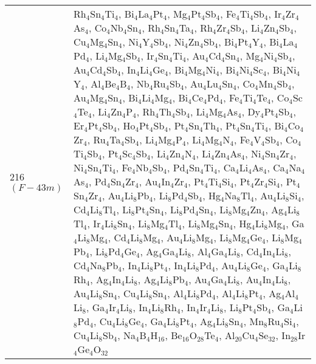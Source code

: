 {\begin{longtable}{p{7.315em}|p{40em}}
    216 $(F-43m)$ & Rh$_{4}$Sn$_{4}$Ti$_{4}$, Bi$_{4}$La$_{4}$Pt$_{4}$, Mg$_{4}$Pt$_{4}$Sb$_{4}$, Fe$_{4}$Ti$_{4}$Sb$_{4}$, Ir$_{4}$Zr$_{4}$As$_{4}$, Co$_{4}$Nb$_{4}$Sn$_{4}$, Rh$_{4}$Sn$_{4}$Ta$_{4}$, Rh$_{4}$Zr$_{4}$Sb$_{4}$, Li$_{4}$Zn$_{4}$Sb$_{4}$, Cu$_{4}$Mg$_{4}$Sn$_{4}$, Ni$_{4}$Y$_{4}$Sb$_{4}$, Ni$_{4}$Zn$_{4}$Sb$_{4}$, Bi$_{4}$Pt$_{4}$Y$_{4}$, Bi$_{4}$La$_{4}$Pd$_{4}$, Li$_{4}$Mg$_{4}$Sb$_{4}$, Ir$_{4}$Sn$_{4}$Ti$_{4}$, Au$_{4}$Cd$_{4}$Sn$_{4}$, Mg$_{4}$Ni$_{4}$Sb$_{4}$, Au$_{4}$Cd$_{4}$Sb$_{4}$, In$_{4}$Li$_{4}$Ge$_{4}$, Bi$_{4}$Mg$_{4}$Ni$_{4}$, Bi$_{4}$Ni$_{4}$Sc$_{4}$, Bi$_{4}$Ni$_{4}$Y$_{4}$, Al$_{4}$Be$_{4}$B$_{4}$, Nb$_{4}$Ru$_{4}$Sb$_{4}$, Au$_{4}$Lu$_{4}$Sn$_{4}$, Co$_{4}$Mn$_{4}$Sb$_{4}$, Au$_{4}$Mg$_{4}$Sn$_{4}$, Bi$_{4}$Li$_{4}$Mg$_{4}$, Bi$_{4}$Ce$_{4}$Pd$_{4}$, Fe$_{4}$Ti$_{4}$Te$_{4}$, Co$_{4}$Sc$_{4}$Te$_{4}$, Li$_{4}$Zn$_{4}$P$_{4}$, Rh$_{4}$Th$_{4}$Sb$_{4}$, Li$_{4}$Mg$_{4}$As$_{4}$, Dy$_{4}$Pt$_{4}$Sb$_{4}$, Er$_{4}$Pt$_{4}$Sb$_{4}$, Ho$_{4}$Pt$_{4}$Sb$_{4}$, Pt$_{4}$Sn$_{4}$Th$_{4}$, Pt$_{4}$Sn$_{4}$Ti$_{4}$, Bi$_{4}$Co$_{4}$Zr$_{4}$, Ru$_{4}$Ta$_{4}$Sb$_{4}$, Li$_{4}$Mg$_{4}$P$_{4}$, Li$_{4}$Mg$_{4}$N$_{4}$, Fe$_{4}$V$_{4}$Sb$_{4}$, Co$_{4}$Ti$_{4}$Sb$_{4}$, Pt$_{4}$Sc$_{4}$Sb$_{4}$, Li$_{4}$Zn$_{4}$N$_{4}$, Li$_{4}$Zn$_{4}$As$_{4}$, Ni$_{4}$Sn$_{4}$Zr$_{4}$, Ni$_{4}$Sn$_{4}$Ti$_{4}$, Fe$_{4}$Nb$_{4}$Sb$_{4}$, Pd$_{4}$Sn$_{4}$Ti$_{4}$, Ca$_{4}$Li$_{4}$As$_{4}$, Ca$_{4}$Na$_{4}$As$_{4}$, Pd$_{4}$Sn$_{4}$Zr$_{4}$, Au$_{4}$In$_{4}$Zr$_{4}$, Pt$_{4}$Ti$_{4}$Si$_{4}$, Pt$_{4}$Zr$_{4}$Si$_{4}$, Pt$_{4}$Sn$_{4}$Zr$_{4}$, Au$_{4}$Li$_{8}$Pb$_{4}$, Li$_{8}$Pd$_{4}$Sb$_{4}$, Hg$_{4}$Na$_{8}$Tl$_{4}$, Au$_{4}$Li$_{8}$Si$_{4}$, Cd$_{4}$Li$_{8}$Tl$_{4}$, Li$_{8}$Pt$_{4}$Sn$_{4}$, Li$_{8}$Pd$_{4}$Sn$_{4}$, Li$_{8}$Mg$_{4}$Zn$_{4}$, Ag$_{4}$Li$_{8}$Tl$_{4}$, Ir$_{4}$Li$_{8}$Sn$_{4}$, Li$_{8}$Mg$_{4}$Tl$_{4}$, Li$_{8}$Mg$_{4}$Sn$_{4}$, Hg$_{4}$Li$_{8}$Mg$_{4}$, Ga$_{4}$Li$_{8}$Mg$_{4}$, Cd$_{4}$Li$_{8}$Mg$_{4}$, Au$_{4}$Li$_{8}$Mg$_{4}$, Li$_{8}$Mg$_{4}$Ge$_{4}$, Li$_{8}$Mg$_{4}$Pb$_{4}$, Li$_{8}$Pd$_{4}$Ge$_{4}$, Ag$_{4}$Ga$_{4}$Li$_{8}$, Al$_{4}$Ga$_{4}$Li$_{8}$, Cd$_{4}$In$_{4}$Li$_{8}$, Cd$_{4}$Na$_{8}$Pb$_{4}$, In$_{4}$Li$_{8}$Pt$_{4}$, In$_{4}$Li$_{8}$Pd$_{4}$, Au$_{4}$Li$_{8}$Ge$_{4}$, Ga$_{4}$Li$_{8}$Rh$_{4}$, Ag$_{4}$In$_{4}$Li$_{8}$, Ag$_{4}$Li$_{8}$Pb$_{4}$, Au$_{4}$Ga$_{4}$Li$_{8}$, Au$_{4}$In$_{4}$Li$_{8}$, Au$_{4}$Li$_{8}$Sn$_{4}$, Cu$_{4}$Li$_{8}$Sn$_{4}$, Al$_{4}$Li$_{8}$Pd$_{4}$, Al$_{4}$Li$_{8}$Pt$_{4}$, Ag$_{4}$Al$_{4}$Li$_{8}$, Ga$_{4}$Ir$_{4}$Li$_{8}$, In$_{4}$Li$_{8}$Rh$_{4}$, In$_{4}$Ir$_{4}$Li$_{8}$, Li$_{8}$Pt$_{4}$Sb$_{4}$, Ga$_{4}$Li$_{8}$Pd$_{4}$, Cu$_{4}$Li$_{8}$Ge$_{4}$, Ga$_{4}$Li$_{8}$Pt$_{4}$, Ag$_{4}$Li$_{8}$Sn$_{4}$, Mn$_{8}$Ru$_{4}$Si$_{4}$, Cu$_{4}$Li$_{8}$Sb$_{4}$, Na$_{4}$B$_{4}$H$_{16}$, Be$_{16}$O$_{28}$Te$_{4}$, Al$_{20}$Cu$_{4}$Se$_{32}$, In$_{28}$Ir$_{4}$Ge$_{4}$O$_{32}$ \\

\end{longtable}}
